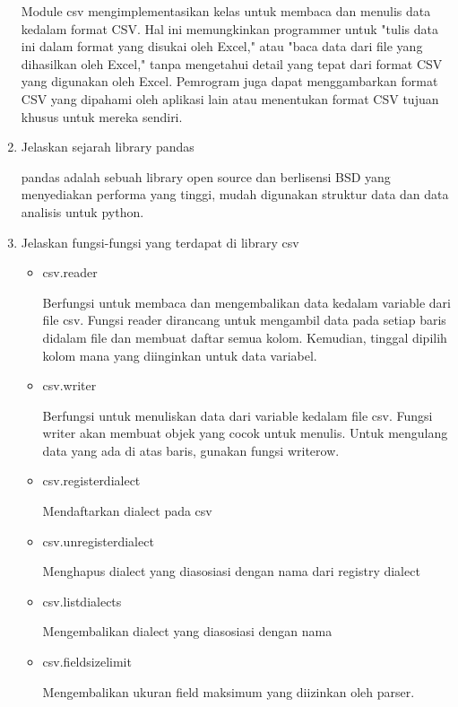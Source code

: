 \begin{enumerate}
Module csv mengimplementasikan kelas untuk membaca dan menulis data kedalam format CSV. Hal ini memungkinkan programmer untuk "tulis data ini dalam format yang disukai oleh Excel," atau "baca data dari file yang dihasilkan oleh Excel," tanpa mengetahui detail yang tepat dari format CSV yang digunakan oleh Excel. Pemrogram juga dapat menggambarkan format CSV yang dipahami oleh aplikasi lain atau menentukan format CSV tujuan khusus untuk mereka sendiri.

\item Jelaskan sejarah library pandas

pandas adalah sebuah library open source dan berlisensi BSD yang menyediakan performa yang tinggi, mudah digunakan struktur data dan data analisis untuk python.

\item Jelaskan fungsi-fungsi yang terdapat di library csv
\begin{itemize}
	\item csv.reader
	
	Berfungsi untuk membaca dan mengembalikan data kedalam variable dari file csv.
	Fungsi reader dirancang untuk mengambil data pada setiap baris didalam file dan membuat daftar semua kolom. Kemudian, tinggal dipilih kolom mana yang diinginkan untuk data variabel.
	
	
	\item csv.writer
	
	Berfungsi untuk menuliskan data dari variable kedalam file csv.
	Fungsi writer akan membuat objek yang cocok untuk menulis. Untuk mengulang data yang ada di atas baris, gunakan fungsi writerow.
	
	
	\item csv.register\textunderscore dialect
	
	Mendaftarkan dialect pada csv
	\item csv.unregister\textunderscore dialect
	
	Menghapus dialect yang diasosiasi dengan nama dari registry dialect
	
	\item csv.list\textunderscore dialects
	
	Mengembalikan dialect yang diasosiasi dengan nama
	
	\item csv.field\textunderscore size\textunderscore limit
	
	Mengembalikan ukuran field maksimum yang diizinkan oleh parser.
	

\end{itemize}
\end{enumerate}
